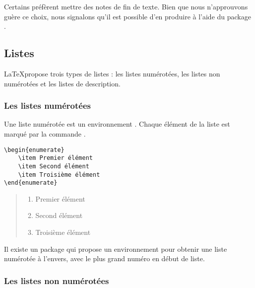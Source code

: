 \begin{anedocte}
	Certains préfèrent mettre des notes de fin de texte. Bien que nous n'approuvons guère ce choix, nous signalons qu'il est possible d'en produire à l'aide du package .
\end{anedocte}

\subsection{Listes}

\LaTeX propose trois types de listes : les listes numérotées, les listes non numérotées et les listes de description.

\subsubsection{Les listes numérotées}

Une liste numérotée est un environnement .
Chaque élément de la liste est marqué par la commande .

\begin{verbatim}
\begin{enumerate}
	\item Premier élément
	\item Second élément
	\item Troisième élément
\end{enumerate}
\end{verbatim}

\begin{quotation}
\noindent\begin{enumerate}
	\item Premier élément
	\item Second élément
	\item Troisième élément
\end{enumerate}
\end{quotation}

\begin{anedocte}
Il existe un package  qui propose un environnement   pour obtenir une liste numérotée à l'envers, avec le plus grand numéro en début de liste.

\end{anedocte}
\subsubsection{Les listes non numérotées}

